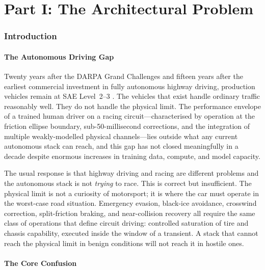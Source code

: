 \documentclass[11pt,twocolumn]{article}
\theoremstyle{definition}
\theoremstyle{remark}
\begin{document}
\tableofcontents

\bigskip

\part*{Part I: The Architectural Problem}

\section{Introduction}
\label{sec:intro}

\subsection{The Autonomous Driving Gap}

Twenty years after the DARPA Grand Challenges \cite{thrun2006stanley,urmson2008boss} and fifteen years after the earliest commercial investment in fully autonomous highway driving, production vehicles remain at SAE Level~2--3 \cite{sae2021j3016}. The vehicles that exist handle ordinary traffic reasonably well. They do not handle the physical limit. The performance envelope of a trained human driver on a racing circuit---characterised by operation at the friction ellipse boundary, sub-50-millisecond corrections, and the integration of multiple weakly-modelled physical channels---lies outside what any current autonomous stack can reach, and this gap has not closed meaningfully in a decade despite enormous increases in training data, compute, and model capacity.

The usual response is that highway driving and racing are different problems and the autonomous stack is not \emph{trying} to race. This is correct but insufficient. The physical limit is not a curiosity of motorsport; it is where the car must operate in the worst-case road situation. Emergency evasion, black-ice avoidance, crosswind correction, split-friction braking, and near-collision recovery all require the same class of operations that define circuit driving: controlled saturation of tire and chassis capability, executed inside the window of a transient. A stack that cannot reach the physical limit in benign conditions will not reach it in hostile ones.

\subsection{The Core Confusion}
\end{document}
